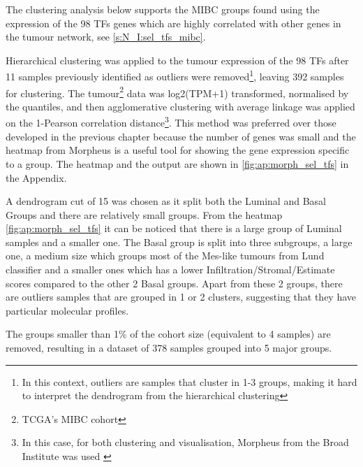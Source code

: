 The clustering analysis below supports the MIBC groups found using the expression of the 98 TFs genes which are highly correlated with other genes in the tumour network, see \cref{s:N_I:sel_tfs_mibc}.

Hierarchical clustering was applied to the tumour expression of the 98 TFs after 11 samples previously identified as outliers were removed\footnote{In this context, outliers are samples that cluster in 1-3 groups, making it hard to interpret the dendrogram from the hierarchical clustering}, leaving 392 samples for clustering. The tumour\footnote{TCGA's MIBC cohort} data was log2(TPM+1) transformed, normalised by the quantiles, and then agglomerative clustering with average linkage was applied on the 1-Pearson correlation distance\footnote{In this case, for both clustering and visualisation, Morpheus from the Broad Institute was used \cite{Broad-InstituteUnknown-kn}}. This method was preferred over those developed in the previous chapter because the number of genes was small and the heatmap from Morpheus is a useful tool for showing the gene expression specific to a group. The heatmap and the output are shown in \cref{fig:ap:morph_sel_tfs} in the Appendix.

A dendrogram cut of 15 was chosen as it split both the Luminal and Basal Groups and there are relatively small groups. From the heatmap \cref{fig:ap:morph_sel_tfs} it can be noticed that there is a large group of Luminal samples and a smaller one. The Basal group is split into three subgroups, a large one, a medium size which groups most of the Mes-like tumours from Lund classifier and a smaller ones which has a lower Infiltration/Stromal/Estimate scores compared to the other 2 Basal groups. Apart from these 2 groups, there are outliers samples that are grouped in 1 or 2 clusters, suggesting that they have particular molecular profiles.

The groups smaller than 1\% of the cohort size (equivalent to 4 samples) are removed, resulting in a dataset of 378 samples grouped into 5 major groups. 


